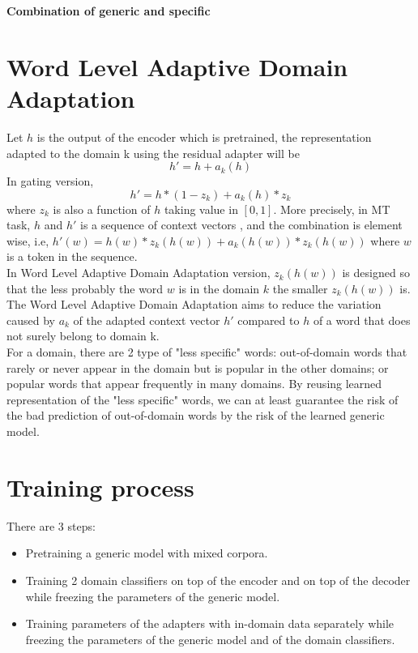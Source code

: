 \documentclass[12pt,a4paper,twoside]{report}
\theoremstyle{definition}
\begin{document}
\begin{center}
{\LARGE \bf Combination of generic and specific}\\
\end{center}
\setlength{\belowdisplayskip}{8pt} \setlength{\belowdisplayshortskip}{8pt}
\setlength{\abovedisplayskip}{8pt} \setlength{\abovedisplayshortskip}{8pt}
\setlength{\parskip}{0.1cm}
\setlength{\parindent}{1em}
\section*{Word Level Adaptive Domain Adaptation}
Let $h$ is the output of the encoder which is pretrained, the representation adapted to the domain k using the residual adapter will be $$h' = h + a_k(h)$$ In gating version, $$h' = h * (1-z_k) + a_k(h) * z_k$$ where $z_k$ is also a function of $h$ taking value in $[0,1]$. More precisely, in MT task, $h$ and $h'$ is a sequence of context vectors , and the combination is element wise, i.e, $h'(w) = h(w) * z_k(h(w)) + a_k(h(w)) * z_k(h(w))$ where $w$ is a token in the sequence.
\\

In Word Level Adaptive Domain Adaptation version, $z_k(h(w))$ is designed so that the less probably the word $w$ is in the domain $k$ the smaller $z_k(h(w))$ is. The Word Level Adaptive Domain Adaptation aims to reduce the variation caused by $a_k$ of the adapted context vector $h'$ compared to $h$ of a word that does not surely belong to domain k. \\

For a domain, there are 2 type of "less specific" words: out-of-domain words that rarely or never appear in the domain but is popular in the other domains; or popular words that appear frequently in many domains. By reusing learned representation of the "less specific" words, we can at least guarantee the risk of the bad prediction of out-of-domain words by the risk of the learned generic model.
\section*{Training process}
There are 3 steps:
\begin{itemize}
	\item Pretraining a generic model with mixed corpora.
	\item Training 2 domain classifiers on top of the encoder and on top of the decoder while freezing the parameters of the generic model.
	\item Training parameters of the adapters with in-domain data separately while freezing the parameters of the generic model and of the domain classifiers.
\end{itemize}
\end{document}
